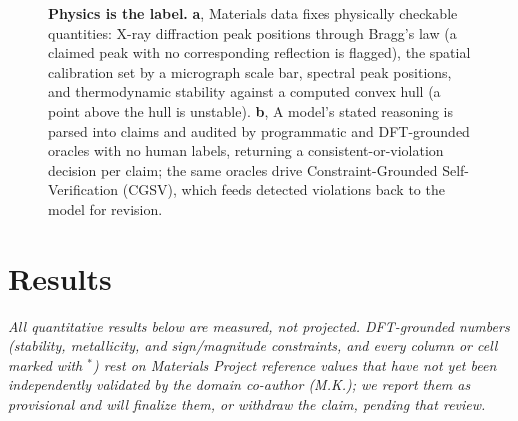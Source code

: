 \documentclass[pdflatex,sn-nature]{sn-jnl}
\begin{document}
\begin{figure}[t]
{}
\caption{\textbf{Physics is the label.} \textbf{a}, Materials data fixes physically checkable quantities: X-ray diffraction peak positions through Bragg's law (a claimed peak with no corresponding reflection is flagged), the spatial calibration set by a micrograph scale bar, spectral peak positions, and thermodynamic stability against a computed convex hull (a point above the hull is unstable). \textbf{b}, A model's stated reasoning is parsed into claims and audited by programmatic and DFT-grounded oracles with no human labels, returning a consistent-or-violation decision per claim; the same oracles drive Constraint-Grounded Self-Verification (CGSV), which feeds detected violations back to the model for revision.}
\label{fig:teaser}
\end{figure}

\section*{Results}
\emph{All quantitative results below are measured, not projected. DFT-grounded
numbers (stability, metallicity, and sign/magnitude constraints, and every column or
cell marked with $^{*}$) rest on Materials Project reference values that have not yet
been independently validated by the domain co-author (M.K.); we report them as
provisional and will finalize them, or withdraw the claim, pending that review.}
\end{document}

